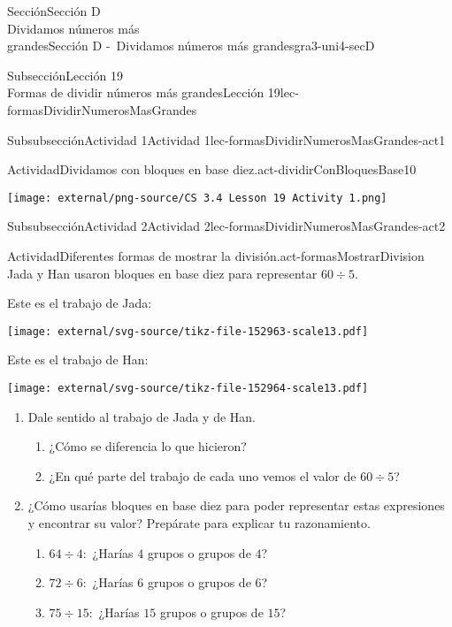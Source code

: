 \begin{sectionptx}{Sección}{{\Large Sección D\\}Dividamos números más\\grandes}{}{Sección D -~Dividamos números más grandes}{}{}{gra3-uni4-secD}
\begin{subsectionptx}{Subsección}{{\normalsize Lección 19\\[-0.05cm]}Formas de dividir números más grandes}{}{Lección 19}{}{}{lec-formasDividirNumerosMasGrandes}
\begin{subsubsectionptx}{Subsubsección}{Actividad 1}{}{Actividad 1}{}{}{lec-formasDividirNumerosMasGrandes-act1}
\begin{activity}{Actividad}{Dividamos con bloques en base diez.}{act-dividirConBloquesBase10}
\begin{sidebyside}{2}{0}{0}{0.1}
\begin{sbspanel}{0.2}
\texttt{[image: external/png-source/CS 3.4 Lesson 19 Activity 1.png]}
\end{sbspanel}%
\end{sidebyside}%
\end{activity}%
\end{subsubsectionptx}
%
%
\typeout{************************************************}
\typeout{************************************************}
%
\begin{subsubsectionptx}{Subsubsección}{Actividad 2}{}{Actividad 2}{}{}{lec-formasDividirNumerosMasGrandes-act2}
\begin{activity}{Actividad}{Diferentes formas de mostrar la división.}{act-formasMostrarDivision}%
Jada y Han usaron bloques en base diez para representar \(60 \div 5\).%
\par
Este es el trabajo de Jada:%
\begin{image}{0}{1}{0}{}%
\texttt{[image: external/svg-source/tikz-file-152963-scale13.pdf]}
\end{image}%
Este es el trabajo de Han:%
\begin{image}{0}{1}{0}{}%
\texttt{[image: external/svg-source/tikz-file-152964-scale13.pdf]}
\end{image}%
%
\begin{enumerate}
\item{}Dale sentido al trabajo de Jada y de Han.%
%
\begin{enumerate}
\item{}¿Cómo se diferencia lo que hicieron?%
\item{}¿En qué parte del trabajo de cada uno vemos el valor de \(60 \div 5\)?%
\end{enumerate}
\item{}¿Cómo usarías bloques en base diez para poder representar estas expresiones y encontrar su valor? Prepárate para explicar tu razonamiento.%
%
\begin{enumerate}
\item{}\(64 \div 4:\) ¿Harías \(4\) grupos o grupos de \(4\)?%
\item{}\(72 \div 6:\) ¿Harías \(6\) grupos o grupos de \(6\)?%
\item{}\(75 \div 15:\) ¿Harías \(15\) grupos o grupos de \(15\)?%
\end{enumerate}
\end{enumerate}
\end{activity}%
\end{subsubsectionptx}

\end{subsectionptx}
\end{sectionptx}

